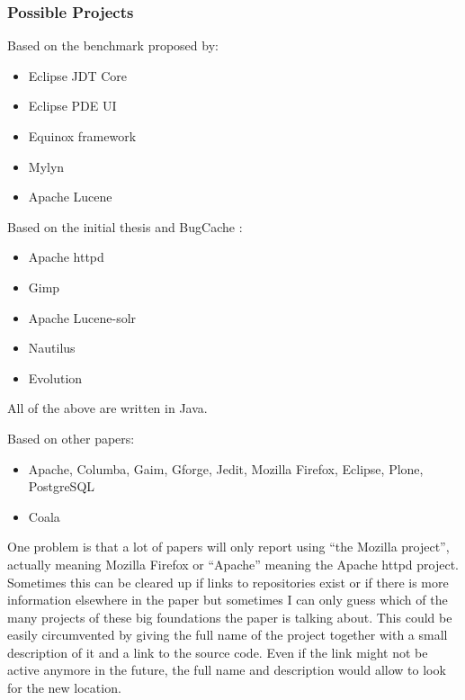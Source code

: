 \subsubsection{Possible Projects}

Based on the benchmark proposed by\textcite{6035727}:
\begin{itemize}
    \item Eclipse JDT Core
    \item Eclipse PDE UI
    \item Equinox framework
    \item Mylyn
    \item Apache Lucene
\end{itemize}

Based on the initial thesis and BugCache \textcite{Rahman:2011:BIH:2025113.2025157}:
\begin{itemize}
    \item Apache httpd
    \item Gimp
    \item Apache Lucene-solr
    \item Nautilus
    \item Evolution
\end{itemize}
 
All of the above are written in Java. %
 
Based on other papers:
\begin{itemize}
    \item Apache, Columba, Gaim, Gforge, Jedit, Mozilla Firefox, Eclipse, Plone, PostgreSQL \cite{5431727}
    \item Coala \cite{scholz2016line}
\end{itemize}

One problem is that a lot of papers will only report using  ``the Mozilla project'', actually meaning Mozilla Firefox or ``Apache'' meaning the Apache httpd project. Sometimes this can be cleared up if links to repositories exist or if there is more information elsewhere in the paper but sometimes I can only guess which of the many projects of these big foundations the paper is talking about. %
This could be easily circumvented by giving the full name of the project together with a small description of it and a link to the source code. Even if the link might not be active anymore in the future, the full name and description would allow to look for the new location. %

